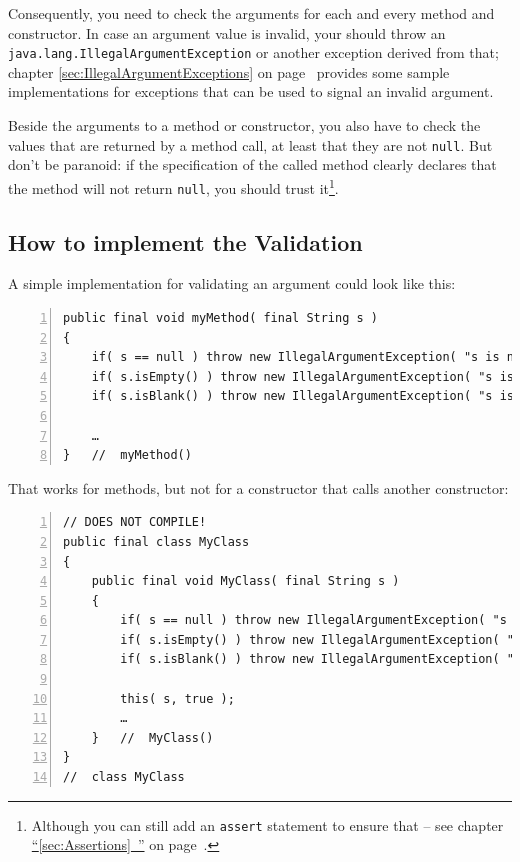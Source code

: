 \documentclass[11pt,a4paper, titlepage, parskip=half, headsepline, footsepline, cleardoublepage=current, headheight=1cm]{scrbook}
\newcommand*{\tqfullvref}[1]{\hyperref[{#1}]{“\ref*{#1}~\nameref*{#1}”} on page~\pageref{#1}}
\newcommand*{\tqvref}[1]{\hyperref[{#1}]{\ref*{#1}} on page~\pageref{#1}}
\begin{document}
Consequently, you need to check the arguments for each and every method and constructor. 
In case an argument value is invalid, your should throw an \lstinline|java.lang.IllegalArgumentException|\autocite{ORACLE_DOC_ILLEGALARGUMENTEXCEPTION_CLASS} or another exception derived from that; chapter \tqvref{sec:IllegalArgumentExceptions} provides some sample implementations for exceptions that can be used to signal an invalid argument.

Beside the arguments to a method or constructor, you also have to check the values that are returned by a method call, at least that they are not \lstinline|null|. But don't be paranoid: if the specification of the called method clearly declares that the method will not return \lstinline|null|, you should trust it\footnote{Although you can still add an \lstinline|assert| statement to ensure that – see chapter \tqfullvref{sec:Assertions}.}.


\subsection{How to implement the Validation}\label{sec:ImplementValidation}
A simple implementation for validating an argument could look like this:
\begin{lstlisting}[numbers=left]
public final void myMethod( final String s )
{
    if( s == null ) throw new IllegalArgumentException( "s is null" );
    if( s.isEmpty() ) throw new IllegalArgumentException( "s is empty" );
    if( s.isBlank() ) throw new IllegalArgumentException( "s is blank" );
    
    …
}   //  myMethod()
\end{lstlisting}

That works for methods, but not for a constructor that calls another constructor:
\begin{lstlisting}[numbers=left]
// DOES NOT COMPILE!
public final class MyClass
{
    public final void MyClass( final String s )
    {
        if( s == null ) throw new IllegalArgumentException( "s is null" );
        if( s.isEmpty() ) throw new IllegalArgumentException( "s is empty" );
        if( s.isBlank() ) throw new IllegalArgumentException( "s is blank" );
    
        this( s, true );
        …
    }   //  MyClass()
}
//  class MyClass
\end{lstlisting}
\end{document}
